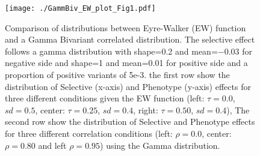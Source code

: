 \documentclass[a4paper,11pt]{article}
\newcommand{\beginsupplement}{%
        \setcounter{table}{0}
        \renewcommand{\thetable}{S\arabic{table}}%
        \setcounter{figure}{0}
        \renewcommand{\thefigure}{S\arabic{figure}}%
}
\begin{document}



\newpage
\beginsupplement

\begin{figure}[h]
{\texttt{[image: ./GammBiv\_EW\_plot\_Fig1.pdf]}}
\caption{Comparison of distributions between Eyre-Walker (EW) function and a Gamma Bivariant correlated distribution. The selective effect follows a gamma distribution with shape=0.2 and mean=$-0.03$ for negative side and shape=1 and mean=0.01 for positive side and a proportion of positive variants of 5e-3. the first row show the distribution of Selective (x-axis) and Phenotype (y-axis) effects for three different conditions given the EW function (left: $\tau=0.0$, $sd=0.5$, center: $\tau=0.25$, $sd=0.4$, right: $\tau=0.50$, $sd=0.4$), The second row show the distribution of Selective and Phenotype effects for three different correlation conditions (left: $\rho=0.0$, center: $\rho=0.80$ and  left $\rho=0.95$) using the Gamma distribution. }
\label{comEWvsBiv}
\hspace*{-0.5cm}
\end{figure}
\end{document}
